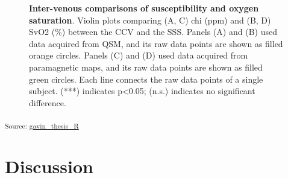 \documentclass[
true
]{sn-jnl}
\begin{document}
\begin{figure}[H]


\caption{\label{fig-regionplot}\textbf{Inter-venous comparisons of
susceptibility and oxygen saturation}. Violin plots comparing (A, C) chi
(ppm) and (B, D) SvO2 (\%) between the CCV and the SSS. Panels (A) and
(B) used data acquired from QSM, and its raw data points are shown as
filled orange circles. Panels (C) and (D) used data acquired from
paramagnetic maps, and its raw data points are shown as filled green
circles. Each line connects the raw data points of a single subject.
(***) indicates p\textless0.05; (n.s.) indicates no significant
difference.}

\end{figure}%

\textsubscript{Source:
\href{https://WeberLab.github.io/Chisep_CSVO2_Manuscript/notebooks/gavin_thesis_markdown.qmd.html\#cell-fig-regionplot}{gavin\_thesis\_R}}

\section{Discussion}\label{sec-discussion}
\end{document}
